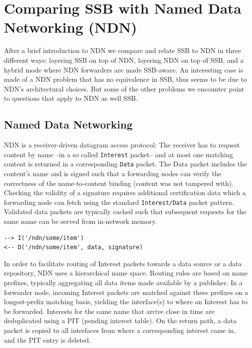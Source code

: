 \documentclass[10pt,sigconf]{acmart}
\begin{document}
\section{Comparing SSB with Named Data Networking (NDN)}
\label{sect:NDN}

After a brief introduction to NDN we compare and relate SSB to NDN in
three different ways: layering SSB on top of NDN, layering NDN on top
of SSB, and a hybrid mode where NDN forwarders are made SSB-aware. An
interesting case is made of a NDN problem that has no equivalence in
SSB, thus seems to be due to NDN's architectural choices. But some of
the other problems we encounter point to questions that apply to NDN
as well SSB.

\subsection{Named Data Networking}

NDN is a receiver-driven datagram access protocol: The receiver has to
request content by name --in a so called {\tt Interest} packet-- and
at most one matching content is returned in a corresponding {\tt Data}
packet. The Data packet includes the content's name and is signed such
that a forwarding nodes can verify the correctness of the
name-to-content binding (content was not tampered with). Checking the validity of a signature requires
additional certification data which a forwarding node can fetch using
the standard {\tt Interest/Data} packet pattern. Validated data
packets are typically cached such that subsequent requests for the
same name can be served from in-network memory.

\begin{verbatim}
--> I('/ndn/some/item')
<-- D('/ndn/some/item', data, signature)
\end{verbatim}

In order to facilitate routing of Interest packets towards a data
source or a data repository, NDN uses a hierarchical name
space. Routing rules are based on name prefixes, typically aggregating
all data items made available by a publisher. In a forwarder node,
incoming Interest packets are matched against these prefixes on a
longest-prefix matching basis, yielding the interface(s) to where an
Interest has to be forwarded. Interests for the same name that arrive
close in time are deduplicated using a PIT (pending interest
table). On the return path, a data packet is copied to all interfaces
from where a corresponding interest came in, and the PIT entry is
deleted.
\end{document}
